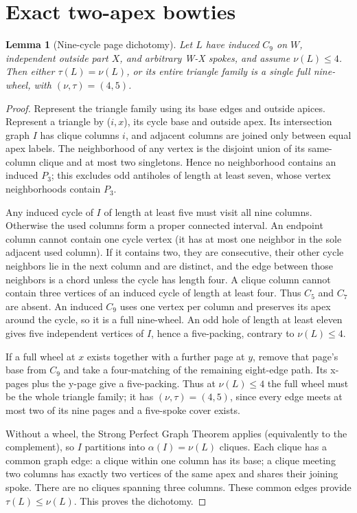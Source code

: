 \documentclass[11pt]{article}
\newtheorem{lemma}[theorem]{Lemma}
\theoremstyle{definition}\newtheorem{definition}[theorem]{Definition}
\theoremstyle{remark}\newtheorem{remark}[theorem]{Remark}
\begin{document}
\section{Exact two-apex bowties}\label{sec:bowtie}
\begin{lemma}[Nine-cycle page dichotomy]\label{lem:cycle-pages}
Let \(L\) have induced \(C_9\) on \(W\), independent outside part \(X\), and arbitrary W-X spokes, and assume \(\nu(L)\le 4\). Then either \(\tau(L)=\nu(L)\), or its entire triangle family is a single full nine-wheel, with \((\nu,\tau)=(4,5)\).
\end{lemma}
\begin{proof}\leavevmode
Represent the triangle family using its base edges and outside apices. Represent a triangle by (\(i,x\)), its cycle base and outside apex. Its intersection graph \(I\) has clique columns \(i\), and adjacent columns are joined only between equal apex labels. The neighborhood of any vertex is the disjoint union of its same-column clique and at most two singletons. Hence no neighborhood contains an induced \(P_3\); this excludes odd antiholes of length at least seven, whose vertex neighborhoods contain \(P_3\).

Any induced cycle of \(I\) of length at least five must visit all nine columns. Otherwise the used columns form a proper connected interval. An endpoint column cannot contain one cycle vertex (it has at most one neighbor in the sole adjacent used column). If it contains two, they are consecutive, their other cycle neighbors lie in the next column and are distinct, and the edge between those neighbors is a chord unless the cycle has length four. A clique column cannot contain three vertices of an induced cycle of length at least four. Thus \(C_5\) and \(C_7\) are absent. An induced \(C_9\) uses one vertex per column and preserves its apex around the cycle, so it is a full nine-wheel. An odd hole of length at least eleven gives five independent vertices of \(I\), hence a five-packing, contrary to \(\nu(L)\le 4\).

If a full wheel at \(x\) exists together with a further page at \(y\), remove that page's base from \(C_9\) and take a four-matching of the remaining eight-edge path. Its x-pages plus the y-page give a five-packing. Thus at \(\nu(L)\le 4\) the full wheel must be the whole triangle family; it has \((\nu,\tau)=(4,5)\), since every edge meets at most two of its nine pages and a five-spoke cover exists.

Without a wheel, the Strong Perfect Graph Theorem \cite{SPGT} applies (equivalently to the complement), so \(I\) partitions into \(\alpha(I)=\nu(L)\) cliques. Each clique has a common graph edge: a clique within one column has its base; a clique meeting two columns has exactly two vertices of the same apex and shares their joining spoke. There are no cliques spanning three columns. These common edges provide \(\tau(L)\le \nu(L)\). This proves the dichotomy.

\end{proof}
\end{document}
